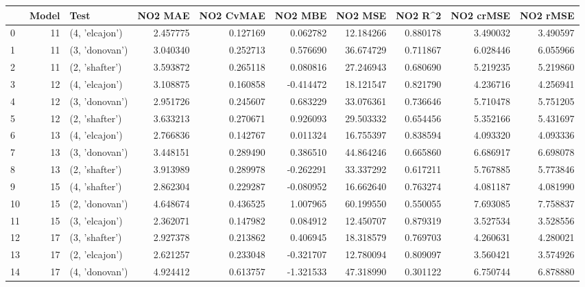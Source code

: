 \begin{tabular}{lrlrrrrrrr}
\toprule
{} &  Model &            Test &   NO2 MAE &  NO2 CvMAE &   NO2 MBE &    NO2 MSE &   NO2 R\textasciicircum2 &  NO2 crMSE &  NO2 rMSE \\
\midrule
0  &     11 &  (4, 'elcajon') &  2.457775 &   0.127169 &  0.062782 &  12.184266 &  0.880178 &   3.490032 &  3.490597 \\
1  &     11 &  (3, 'donovan') &  3.040340 &   0.252713 &  0.576690 &  36.674729 &  0.711867 &   6.028446 &  6.055966 \\
2  &     11 &  (2, 'shafter') &  3.593872 &   0.265118 &  0.080816 &  27.246943 &  0.680690 &   5.219235 &  5.219860 \\
3  &     12 &  (4, 'elcajon') &  3.108875 &   0.160858 & -0.414472 &  18.121547 &  0.821790 &   4.236716 &  4.256941 \\
4  &     12 &  (3, 'donovan') &  2.951726 &   0.245607 &  0.683229 &  33.076361 &  0.736646 &   5.710478 &  5.751205 \\
5  &     12 &  (2, 'shafter') &  3.633213 &   0.270671 &  0.926093 &  29.503332 &  0.654456 &   5.352166 &  5.431697 \\
6  &     13 &  (4, 'elcajon') &  2.766836 &   0.142767 &  0.011324 &  16.755397 &  0.838594 &   4.093320 &  4.093336 \\
7  &     13 &  (3, 'donovan') &  3.448151 &   0.289490 &  0.386510 &  44.864246 &  0.665860 &   6.686917 &  6.698078 \\
8  &     13 &  (2, 'shafter') &  3.913989 &   0.289978 & -0.262291 &  33.337292 &  0.617211 &   5.767885 &  5.773846 \\
9  &     15 &  (4, 'shafter') &  2.862304 &   0.229287 & -0.080952 &  16.662640 &  0.763274 &   4.081187 &  4.081990 \\
10 &     15 &  (2, 'donovan') &  4.648674 &   0.436525 &  1.007965 &  60.199550 &  0.550055 &   7.693085 &  7.758837 \\
11 &     15 &  (3, 'elcajon') &  2.362071 &   0.147982 &  0.084912 &  12.450707 &  0.879319 &   3.527534 &  3.528556 \\
12 &     17 &  (3, 'shafter') &  2.927378 &   0.213862 &  0.406945 &  18.318579 &  0.769703 &   4.260631 &  4.280021 \\
13 &     17 &  (2, 'elcajon') &  2.621257 &   0.233048 & -0.321707 &  12.780094 &  0.809097 &   3.560421 &  3.574926 \\
14 &     17 &  (4, 'donovan') &  4.924412 &   0.613757 & -1.321533 &  47.318990 &  0.301122 &   6.750744 &  6.878880 \\

\end{tabular}
